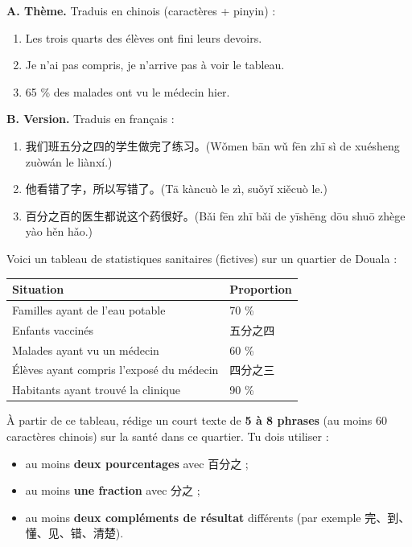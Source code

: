 \documentclass[11pt]{article}
\begin{document}
\begin{exercice}
\textbf{A. Thème.} Traduis en chinois (caractères + pinyin) :
\begin{enumerate}
\item Les trois quarts des élèves ont fini leurs devoirs.
\item Je n'ai pas compris, je n'arrive pas à voir le tableau.
\item 65 \% des malades ont vu le médecin hier.
\end{enumerate}

\textbf{B. Version.} Traduis en français :
\begin{enumerate}
\item 我们班五分之四的学生做完了练习。(Wǒmen bān wǔ fēn zhī sì de xuésheng zuòwán le liànxí.)
\item 他看错了字，所以写错了。(Tā kàncuò le zì, suǒyǐ xiěcuò le.)
\item 百分之百的医生都说这个药很好。(Bǎi fēn zhī bǎi de yīshēng dōu shuō zhège yào hěn hǎo.)
\end{enumerate}
\end{exercice}

\begin{exercice}
Voici un tableau de statistiques sanitaires (fictives) sur un quartier de Douala :
\begin{center}
\begin{tabularx}{\linewidth}{|X|X|}\hline
\rowcolor{popblueL} Situation & Proportion \\ \hline
Familles ayant de l'eau potable & 70 \% \\ \hline
Enfants vaccinés & 五分之四 \\ \hline
Malades ayant vu un médecin & 60 \% \\ \hline
Élèves ayant compris l'exposé du médecin & 四分之三 \\ \hline
Habitants ayant trouvé la clinique & 90 \% \\ \hline
\end{tabularx}
\end{center}
À partir de ce tableau, rédige un court texte de \textbf{5 à 8 phrases} (au moins 60 caractères chinois) sur la santé dans ce quartier. Tu dois utiliser :
\begin{itemize}
\item au moins \textbf{deux pourcentages} avec 百分之 ;
\item au moins \textbf{une fraction} avec 分之 ;
\item au moins \textbf{deux compléments de résultat} différents (par exemple 完、到、懂、见、错、清楚).
\end{itemize}
\end{exercice}
\end{document}
